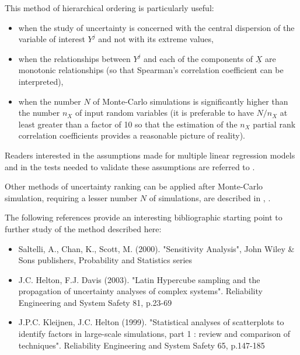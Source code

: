 {
  This method of hierarchical ordering is particularly useful:
  \begin{itemize}
  \item when the study of uncertainty is concerned with the central dispersion of the variable of interest $Y^j$ and not with its extreme values,
  \item when the relationships between $Y^j$ and each of the components of $\underline{X}$ are monotonic relationships (so that Spearman's correlation coefficient can be interpreted),
  \item when the number $N$ of Monte-Carlo simulations is significantly higher than the number $n_X$ of input random variables (it is preferable to have $N/n_X$ at least greater than a factor of 10 so that the estimation of the $n_X$ partial rank correlation coefficients provides a reasonable picture of reality).
  \end{itemize}

  Readers interested in the assumptions made for multiple linear regression models and in the tests needed to validate these assumptions are referred to .

  Other methods of uncertainty ranking can be applied after Monte-Carlo simulation, requiring a lesser number $N$ of simulations, are described in , .

  The following references provide an interesting bibliographic starting point to further study of the method described here:
  \begin{itemize}
  \item Saltelli, A., Chan, K., Scott, M. (2000). "Sensitivity Analysis", John Wiley \& Sons publishers, Probability and Statistics series
  \item J.C. Helton, F.J. Davis (2003). "Latin Hypercube sampling and the propagation of uncertainty analyses of complex systems". Reliability Engineering and System Safety 81, p.23-69
  \item J.P.C. Kleijnen, J.C. Helton (1999). "Statistical analyses of scatterplots to identify factors in large-scale simulations, part 1 : review and comparison of techniques". Reliability Engineering and System Safety 65, p.147-185
  \end{itemize}}
